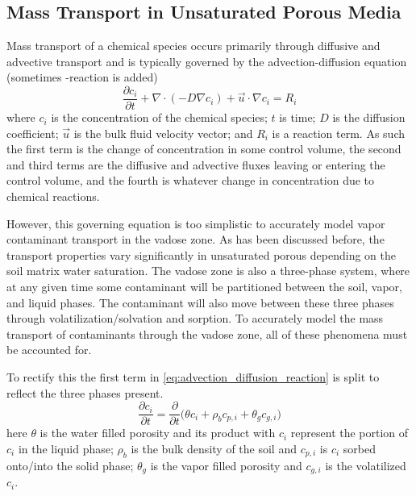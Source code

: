 \subsection{Mass Transport in Unsaturated Porous Media}\label{sec:mass_transport}

Mass transport of a chemical species occurs primarily through diffusive and advective transport and is typically governed by the advection-diffusion equation (sometimes -reaction is added)
\begin{equation}\label{eq:advection_diffusion_reaction}
  \frac{\partial c_i}{\partial t} + \nabla \cdot (-D \nabla c_i) + \vec{u} \cdot \nabla c_i = R_i
\end{equation}
where $c_i$ is the concentration of the chemical species; $t$ is time; $D$ is the diffusion coefficient; $\vec{u}$ is the bulk fluid velocity vector; and $R_i$ is a reaction term.
As such the first term is the change of concentration in some control volume, the second and third terms are the diffusive and advective fluxes leaving or entering the control volume, and the fourth is whatever change in concentration due to chemical reactions.\par

However, this governing equation is too simplistic to accurately model vapor contaminant transport in the vadose zone.
As has been discussed before, the transport properties vary significantly in unsaturated porous depending on the soil matrix water saturation.
The vadose zone is also a three-phase system, where at any given time some contaminant will be partitioned between the soil, vapor, and liquid phases.
The contaminant will also move between these three phases through volatilization/solvation and sorption.
To accurately model the mass transport of contaminants through the vadose zone, all of these phenomena must be accounted for.\par

To rectify this the first term in \eqref{eq:advection_diffusion_reaction} is split to reflect the three phases present.
\begin{equation}\label{eq:mass_distribution}
  \frac{\partial c_i}{\partial t} =
  \frac{\partial}{\partial t} \Big( \theta c_i + \rho_b c_{p,i} + \theta_g c_{g,i} \Big)
\end{equation}
here $\theta$ is the water filled porosity and its product with $c_i$ represent the portion of $c_i$ in the liquid phase; $\rho_b$ is the bulk density of the soil and $c_{p,i}$ is $c_i$ sorbed onto/into the solid phase; $\theta_g$ is the vapor filled porosity and $c_{g,i}$ is the volatilized $c_i$.\par

